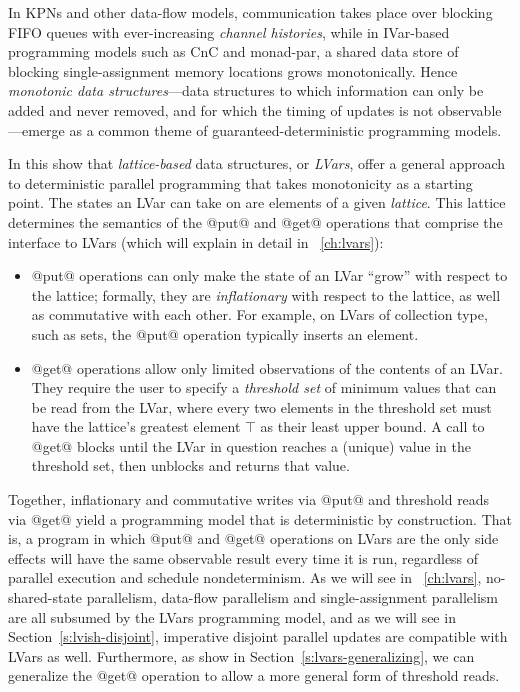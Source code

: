In KPNs and other data-flow models, communication takes place over
blocking FIFO queues with ever-increasing \emph{channel histories},
while in IVar-based programming models such as CnC and monad-par, a
shared data store of blocking single-assignment memory locations grows
monotonically.  Hence \emph{monotonic data structures}---data
structures to which information can only be added and never removed,
and for which the timing of updates is not observable---emerge as a
common theme of guaranteed-deterministic programming models.

In this  show that \emph{lattice-based} data
structures, or \emph{LVars}, offer a general approach to deterministic
parallel programming that takes monotonicity as a starting point. The
states an LVar can take on are elements of a given
\emph{lattice}.  This lattice determines the
semantics of the @put@ and @get@ operations that comprise the
interface to LVars (which  will explain in detail in
~\ref{ch:lvars}):
\begin{itemize}
\item @put@ operations can only make the state of an LVar ``grow''
  with respect to the lattice; formally, they are \emph{inflationary}
  with respect to the lattice, as well as commutative with each other.
  For example, on LVars of collection type, such as sets, the @put@
  operation typically inserts an element.
\item @get@ operations allow only limited observations of the contents
  of an LVar.  They require the user to specify a \emph{threshold set}
  of minimum values that can be read from the LVar, where every two
  elements in the threshold set must have the lattice's greatest
  element $\top$ as their least upper bound.  A call to @get@ blocks
  until the LVar in question reaches a (unique) value in the threshold
  set, then unblocks and returns that value.
\end{itemize}
Together, inflationary and commutative writes via @put@ and threshold reads via
@get@ yield a programming model that is deterministic by construction.  That
is, a program in which @put@ and @get@ operations on LVars are the
only side effects will have the same observable result every time it is run, regardless of
parallel execution and schedule nondeterminism.  As we will see in ~\ref{ch:lvars}, no-shared-state parallelism, data-flow
parallelism and single-assignment parallelism are all subsumed by the
LVars programming model, and as we will see in
Section~\ref{s:lvish-disjoint}, imperative disjoint parallel updates
are compatible with LVars as well.
Furthermore, as  show in
Section~\ref{s:lvars-generalizing}, 
we can generalize
the @get@ operation to allow a more general form of threshold reads.


